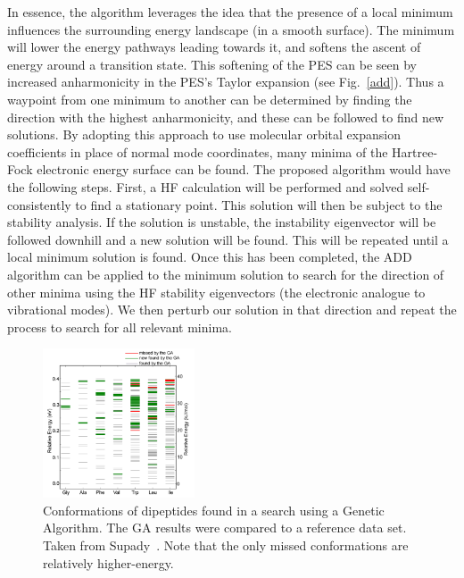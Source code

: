 \documentclass{revtex4}
\begin{document}
    In essence, the algorithm leverages the idea that the 
    presence of a local minimum influences the surrounding energy landscape (in a smooth surface). 
    The minimum will lower the energy pathways leading towards it, and softens the ascent of energy 
    around a transition state. This softening of the PES can be seen by increased anharmonicity in 
    the PES's Taylor expansion (see Fig.~\ref{add}). Thus a waypoint from one minimum to another 
    can 
    be determined by 
    finding the direction with the highest anharmonicity, and these can be followed to find new 
    solutions. By adopting this approach to use 
    molecular orbital expansion 
    coefficients in place of normal mode coordinates, many minima of the Hartree-Fock electronic 
    energy surface can be found. The proposed algorithm would have the following steps. First, a HF 
    calculation will be performed and solved self-consistently to find a stationary point. This 
    solution will then be subject to the stability analysis. If the solution is unstable, the 
    instability eigenvector will be followed downhill and a new solution will be found. This will 
    be repeated until a local minimum solution is found. Once this has been completed, the ADD 
    algorithm can be applied to the minimum solution to search for the direction of other minima 
    using the HF stability eigenvectors (the electronic analogue to vibrational modes). We then 
    perturb our solution in that direction and repeat the process to search for all relevant 
    minima. 
    
    \begin{figure}
      \centering
      \includegraphics[width=0.4\textwidth]{../figures/GA_supady.png}
      \caption{Conformations of dipeptides found in a search using a Genetic Algorithm. The GA 
      results were compared to a reference data set. Taken from Supady~\cite{Supady2015}. Note that 
      the only missed conformations are relatively higher-energy.}
      \label{GA}
    \end{figure}  
    
\end{document}
